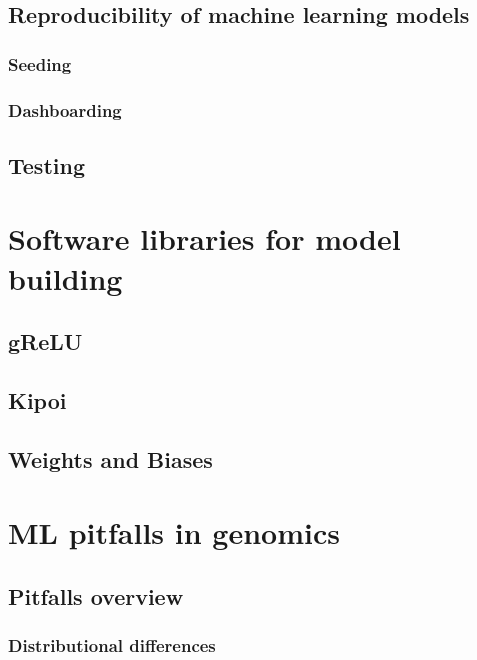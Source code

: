 \documentclass[
]{book}
\begin{document}
\chapter{Reproducibility of machine learning models}\label{reproducibility-of-machine-learning-models}

\section{Seeding}\label{seeding}

\section{Dashboarding}\label{dashboarding}

\chapter{Testing}\label{testing}

\part{Software libraries for model building}\label{part-software-libraries-for-model-building}

\chapter{gReLU}\label{grelu}

\chapter{Kipoi}\label{kipoi}

\chapter{Weights and Biases}\label{weights-and-biases}

\part{ML pitfalls in genomics}\label{part-ml-pitfalls-in-genomics}

\chapter{Pitfalls overview}\label{pitfalls-overview}

\section{Distributional differences}\label{distributional-differences}
\end{document}
